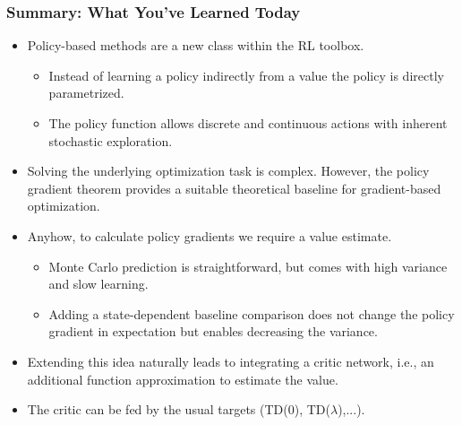 \begin{frame}
\frametitle{Summary: What You've Learned Today}
\begin{itemize}
	\item Policy-based methods are a new class within the RL toolbox.
	\begin{itemize}
		\item Instead of learning a policy indirectly from a value the policy is directly parametrized.\pause
		\item The policy function allows discrete and continuous actions with inherent stochastic exploration.\pause
	\end{itemize}
	\item Solving the underlying optimization task is complex. However, the policy gradient theorem provides a suitable theoretical baseline for gradient-based optimization.\pause
	\item Anyhow, to calculate policy gradients we require a value estimate.
	\begin{itemize}
		\item Monte Carlo prediction is straightforward, but comes with high variance and slow learning.\pause
		\item Adding a state-dependent baseline comparison does not change the policy gradient in expectation but enables decreasing the variance.\pause
	\end{itemize}
	\item Extending this idea naturally leads to integrating a critic network, i.e., an additional function approximation to estimate the value.\pause
	\item The critic can be fed by the usual targets (TD(0), TD($\lambda$),...).
\end{itemize}
\end{frame}

